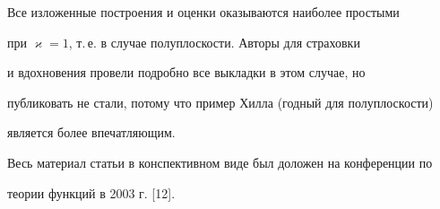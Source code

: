 \begin{notenonum}


Все изложенные построения и оценки оказываются наиболее простыми


при $\varkappa=1$, т.\,е. в случае полуплоскости. Авторы для страховки


и вдохновения провели подробно все выкладки в этом случае, но


публиковать не стали, потому что пример Хилла (годный для полуплоскости)


является более впечатляющим.


\end{notenonum}





Весь материал статьи в конспективном виде был доложен на конференции по 


теории функций в 2003 г. [12].








